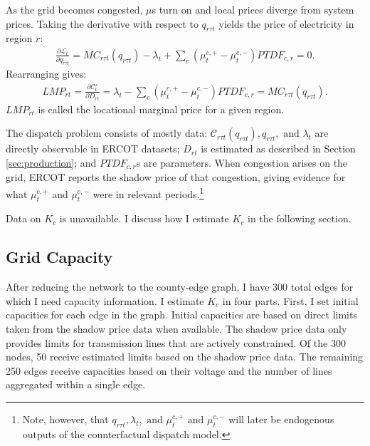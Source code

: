 \documentclass[12pt]{article}
\begin{document}
As the grid becomes congested, $\mu$s turn on and local prices diverge from system prices. Taking the derivative with respect to $q_{r\tau t}$ yields the price of electricity in region $r$:
\begin{align}
    \frac{\partial \mathcal{L}_t}{\partial q_{r\tau t}}
    = MC_{r\tau t}(q_{r\tau t}) - \lambda_t
    + \sum_c (\mu^{c,+}_t-\mu^{c,-}_t)PTDF_{c,r} = 0.
\end{align}
Rearranging gives:
\begin{align}
    LMP_{rt}
    = \frac{\partial \mathcal{C}_t^\star}{\partial D_{rt}}
    = \lambda_t-\sum_c(\mu^{c,+}_t-\mu^{c,-}_t)PTDF_{c,r}
    = MC_{r\tau t}(q_{r\tau t}).
\end{align}
$LMP_{rt}$ is called the locational marginal price for a given region. 

The dispatch problem consists of mostly data: $\mathcal{C}_{r\tau t}(q_{r\tau t}), q_{r\tau t}, \text{ and } \lambda_t$ are directly observable in ERCOT datasets; $D_{rt}$ is estimated as described in Section \ref{sec:production}; and $PTDF_{c,r}$s are parameters. When congestion arises on the grid, ERCOT reports the shadow price of that congestion, giving evidence for what $\mu^{c,+}_t$ and $\mu^{c,-}_t$ were in relevant periods.\footnote{Note, however, that $q_{r\tau t}, \lambda_t, \text{ and } \mu^{c,+}_t \text{ and } \mu^{c,-}_t$ will later be endogenous outputs of the counterfactual dispatch model.}

Data on $K_c$ is unavailable. I discuss how I estimate $K_c$ in the following section. 

\subsection{Grid Capacity}
\label{sec:grid_capacity}

After reducing the network to the county-edge graph, I have 300 total edges for which I need capacity information. I estimate $K_c$ in four parts. First, I set initial capacities for each edge in the graph. Initial capacities are based on direct limits taken from the shadow price data when available. The shadow price data only provides limits for transmission lines that are actively constrained. Of the 300 nodes, 50 receive estimated limits based on the shadow price data. The remaining 250 edges receive capacities based on their voltage and the number of lines aggregated within a single edge. 
\end{document}
